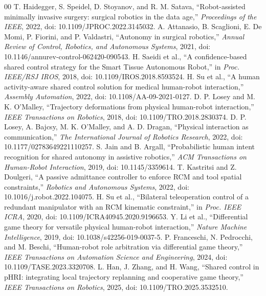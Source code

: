 \documentclass[conference]{IEEEtran}
\begin{document}
\begin{thebibliography}{00}
 T. Haidegger, S. Speidel, D. Stoyanov, and R. M. Satava, ``Robot-assisted minimally invasive surgery: surgical robotics in the data age,'' \emph{Proceedings of the IEEE}, 2022, doi: 10.1109/JPROC.2022.3145032.
 A. Attanasio, B. Scaglioni, E. De Momi, P. Fiorini, and P. Valdastri, ``Autonomy in surgical robotics,'' \emph{Annual Review of Control, Robotics, and Autonomous Systems}, 2021, doi: 10.1146/annurev-control-062420-090543.
 H. Saeidi et al., ``A confidence-based shared control strategy for the Smart Tissue Autonomous Robot,'' in \emph{Proc. IEEE/RSJ IROS}, 2018, doi: 10.1109/IROS.2018.8593524.
 H. Su et al., ``A human activity-aware shared control solution for medical human-robot interaction,'' \emph{Assembly Automation}, 2022, doi: 10.1108/AA-09-2021-0127.
 D. P. Losey and M. K. O'Malley, ``Trajectory deformations from physical human-robot interaction,'' \emph{IEEE Transactions on Robotics}, 2018, doi: 10.1109/TRO.2018.2830374.
 D. P. Losey, A. Bajcsy, M. K. O'Malley, and A. D. Dragan, ``Physical interaction as communication,'' \emph{The International Journal of Robotics Research}, 2022, doi: 10.1177/02783649221110257.
 S. Jain and B. Argall, ``Probabilistic human intent recognition for shared autonomy in assistive robotics,'' \emph{ACM Transactions on Human-Robot Interaction}, 2019, doi: 10.1145/3359614.
 T. Kastritsi and Z. Doulgeri, ``A passive admittance controller to enforce RCM and tool spatial constraints,'' \emph{Robotics and Autonomous Systems}, 2022, doi: 10.1016/j.robot.2022.104075.
 H. Su et al., ``Bilateral teleoperation control of a redundant manipulator with an RCM kinematic constraint,'' in \emph{Proc. IEEE ICRA}, 2020, doi: 10.1109/ICRA40945.2020.9196653.
 Y. Li et al., ``Differential game theory for versatile physical human-robot interaction,'' \emph{Nature Machine Intelligence}, 2019, doi: 10.1038/s42256-019-0037-5.
 P. Franceschi, N. Pedrocchi, and M. Beschi, ``Human-robot role arbitration via differential game theory,'' \emph{IEEE Transactions on Automation Science and Engineering}, 2024, doi: 10.1109/TASE.2023.3320708.
 L. Han, J. Zhang, and H. Wang, ``Shared control in pHRI: integrating local trajectory replanning and cooperative game theory,'' \emph{IEEE Transactions on Robotics}, 2025, doi: 10.1109/TRO.2025.3532510.
\end{thebibliography}
\end{document}
